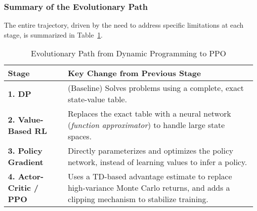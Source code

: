 \subsubsection{Summary of the Evolutionary Path}
The entire trajectory, driven by the need to address specific limitations at each stage, is summarized in Table~\ref{tab:evolution_path}.

\begin{table}[H]
    \centering
    \small
    \caption{Evolutionary Path from Dynamic Programming to PPO}
    \label{tab:evolution_path}
    \begin{tabularx}{\textwidth}{l >{\raggedright\arraybackslash}X}
        \toprule
        \textbf{Stage} & \textbf{Key Change from Previous Stage} \\
        \midrule
        \textbf{1. DP} & 
        (Baseline) Solves problems using a complete, exact state-value table. \\

        \textbf{2. Value-Based RL} & 
        Replaces the exact table with a neural network (\textit{function approximator}) to handle large state spaces. \\

        \textbf{3. Policy Gradient} & 
        Directly parameterizes and optimizes the policy network, instead of learning values to infer a policy. \\

        \textbf{4. Actor-Critic / PPO} & 
        Uses a TD-based advantage estimate to replace high-variance Monte Carlo returns, and adds a clipping mechanism to stabilize training. \\
        \bottomrule
    \end{tabularx}
\end{table}